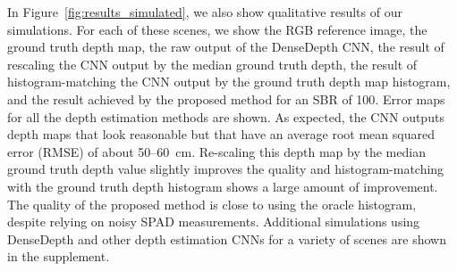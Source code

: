 In Figure~\ref{fig:results_simulated}, we also show qualitative results of our
simulations. For each of these scenes, we show the RGB reference image, the
ground truth depth map, the raw output of the DenseDepth CNN, the result of
rescaling the CNN output by the median ground truth depth, the result of
histogram-matching the CNN output by the ground truth depth map histogram, and
the result achieved by the proposed method for an SBR of 100. Error maps for all
the depth estimation methods are shown. As expected, the CNN outputs depth maps
that look reasonable but that have an average root mean squared error (RMSE) of
about 50--60~cm. Re-scaling this depth map by the median ground truth depth
value slightly improves the quality and histogram-matching with the ground
truth depth histogram shows a large amount of improvement. The quality of the
proposed method is close to using the oracle histogram, despite relying on
noisy SPAD measurements. Additional simulations using DenseDepth and other depth
estimation CNNs for a variety of scenes are shown in the supplement.


